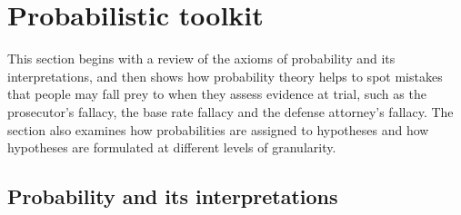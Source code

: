 \documentclass{article}
\begin{document}
\section{Probabilistic toolkit}

\label{sec:toolkit}


This section begins with a  review of the axioms of probability and its interpretations, %
and then shows how probability theory helps to spot mistakes that people may fall prey to 
when they assess evidence at trial, such as the prosecutor's fallacy, the base rate fallacy and the defense attorney's fallacy. %
The section also 
examines how probabilities are assigned to hypotheses  %
and how hypotheses are formulated at different levels of granularity. %





\subsection{Probability and its interpretations}
\label{subsec:prob-int}
\end{document}
